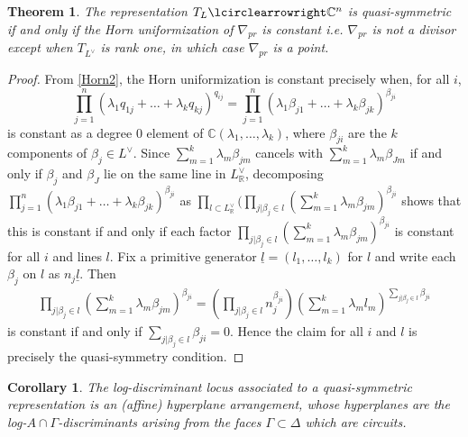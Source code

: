 \documentclass[a4paper]{article}
\theoremstyle{plain}
\newtheorem{thm}{Theorem}[section]
\newtheorem{cor}{Corollary}[thm]
\theoremstyle{definition}
\theoremstyle{remark}
\begin{document}
\begin{thm}
The representation $T_L \lcirclearrowright \mathbb{C}^n$ is quasi-symmetric if and only if the Horn uniformization of $\nabla_{pr}$ is constant i.e.  $\nabla_{pr}$ is not a divisor except when $T_{L^{\vee}}$ is rank one, in which case $\nabla_{pr}$ is a point. 
\label{Main}
\end{thm}

\begin{proof}
From \eqref{Horn2}, the Horn uniformization is constant precisely when, for all $i$,
\begin{equation*}
\prod_{j=1}^n ( \lambda_1 q_{1j}+ \hdots + \lambda_k q_{kj} )^{q_{ij}}=\prod_{j=1}^n ( \lambda_1 \beta_{j1}+ \hdots + \lambda_k \beta_{jk} )^{\beta_{ji}} 
\end{equation*}
is constant as a degree 0 element of $\mathbb{C}(\lambda_1, \hdots, \lambda_k)$, where $\beta_{ji}$ are the $k$ components of $\beta_j \in L^{\vee}$.
Since $\sum_{m=1}^k \lambda_m \beta_{jm}$ cancels with $\sum_{m=1}^k \lambda_m \beta_{Jm}$ if and only if $\beta_j$ and $\beta_{J}$ lie on the same line in $L^{\vee}_{\mathbb{R}}$, decomposing $\prod_{j=1}^n ( \lambda_1 \beta_{j1}+ \hdots + \lambda_k \beta_{jk} )^{\beta_{ji}}$ as $\prod_{l \subset L^{\vee}_{\mathbb{R}}} (\prod_{j| \beta_j \in l} (\sum_{m=1}^k \lambda_m \beta_{jm})^{\beta_{ji}}$ shows that this is constant if and only if each factor $\prod_{j| \beta_j \in l} (\sum_{m=1}^k \lambda_m \beta_{jm})^{\beta_{ji}}$ is constant for all $i$ and lines $l$. Fix a primitive generator $\underline{l}=(l_1, \hdots, l_k)$ for $l$ and write each $\beta_j$ on $l$ as $n_j \underline{l}$. Then
\begin{gather*}
\prod_{j| \beta_j \in l} (\sum_{m=1}^k \lambda_m \beta_{jm})^{\beta_{ji}}=(\prod_{j| \beta_j \in l} 
n_j^{\beta_{ji}})(\sum_{m=1}^k \lambda_m l_{m})^{\sum_{j| \beta_j \in l} \beta_{ji}}  
\end{gather*}
is constant if and only if $\sum_{j| \beta_j \in l} \beta_{ji}=0$. Hence the claim for all $i$ and $l$ is precisely the quasi-symmetry condition.
\end{proof}



\begin{cor}
The log-discriminant locus associated to a quasi-symmetric representation is an (affine) hyperplane arrangement, whose hyperplanes are the log-$A \cap \Gamma$-discriminants arising from the faces $\Gamma \subset \Delta$ which are circuits.
\label{Cor}
\end{cor}
\end{document}
